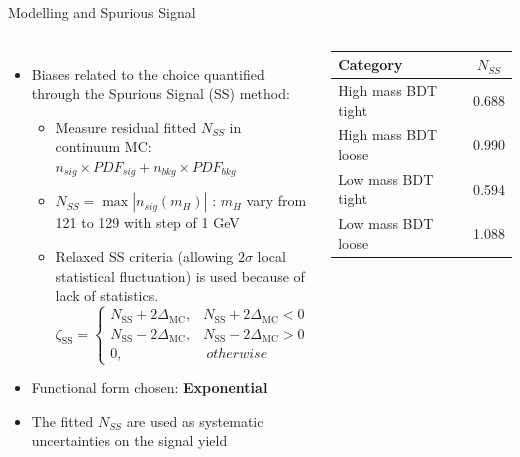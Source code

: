 \begin{frame}{Modelling and Spurious Signal}
\begin{columns}
\begin{itemize}
    \item Biases related to the choice quantified through the Spurious Signal (SS) method:
    \begin{itemize}
        \item Measure residual fitted $N_{SS}$ in continuum MC: $n_{sig} \times PDF_{sig} + n_{bkg} \times PDF_{bkg}$
        \item $N_{SS} = \max|n_{sig}(m_{H})|$ : $m_{H}$ vary from 121 to 129 with step of 1 GeV
        \item Relaxed SS criteria (allowing $2\sigma$ local statistical fluctuation) is used because of lack of statistics. 
        \begin{equation*}
        \zeta_{\mathrm{SS}}=\left\{\begin{array}{ll}
        N_{\mathrm{SS}}+2 \Delta_{\mathrm{MC}}, & N_{\mathrm{SS}}+2 \Delta_{\mathrm{MC}}<0 \\
        N_{\mathrm{SS}}-2 \Delta_{\mathrm{MC}}, & N_{\mathrm{SS}}-2 \Delta_{\mathrm{MC}}>0 \\
        0, & \  otherwise 
        \end{array}\right.
        \end{equation*}
    \end{itemize}
    \item Functional form chosen: \textbf{Exponential} 
    \item The fitted $N_{SS}$ are used as systematic uncertainties on the signal yield
\end{itemize}


\begin{table}[]
    \centering
    \begin{tabular}{lc}
    \hline\hline
       Category  & $N_{SS}$ \\
       \hline
       High mass BDT tight &  0.688 \\
       High mass BDT loose &  0.990 \\
       Low mass BDT tight  &  0.594 \\
       Low mass BDT loose  & 1.088 \\
       \hline\hline
    \end{tabular}
\end{table}

\end{columns}
\end{frame}

